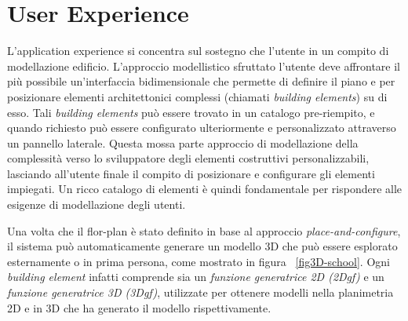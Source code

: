 \section{User Experience}
\label{sec:chapter_2_section_5}


L'application experience si concentra sul sostegno che l'utente in un compito di modellazione edificio.
L'approccio modellistico sfruttato l'utente deve affrontare il pi\`u possibile un'interfaccia bidimensionale che permette
di definire il piano e per posizionare elementi architettonici complessi (chiamati \emph{building elements}) su di esso.
Tali \emph{building elements} può essere trovato in un catalogo pre-riempito, e quando richiesto può essere
configurato ulteriormente e personalizzato attraverso un pannello laterale. Questa mossa parte approccio
di modellazione della complessità verso lo sviluppatore degli elementi costruttivi personalizzabili,
lasciando all'utente finale il compito di posizionare e configurare gli elementi impiegati.
Un ricco catalogo di elementi è quindi fondamentale per rispondere alle esigenze di modellazione degli utenti.


Una volta che il flor-plan è stato definito in base al approccio \emph{place-and-configure}, il sistema pu\`o automaticamente
generare un modello 3D che pu\`o essere esplorato esternamente o in prima persona, come mostrato in figura ~\ref{fig3D-school}.
Ogni \emph{building element} infatti comprende sia un \emph{funzione generatrice 2D (2Dgf)} e un
\emph{funzione generatrice 3D (3Dgf)}, utilizzate per ottenere modelli nella planimetria 2D e in 3D che ha generato il modello
rispettivamente.
